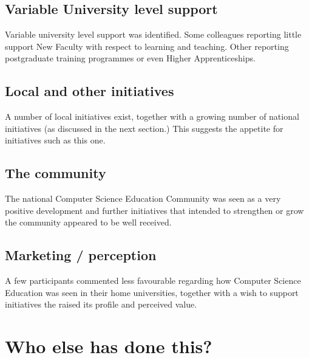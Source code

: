 \documentclass[sigconf]{acmart}
\begin{document}
\subsection{Variable University level support}
Variable university level support was identified. Some colleagues reporting little support New Faculty with respect to learning and teaching. Other reporting postgraduate training programmes or even Higher Apprenticeships.
\subsection{Local and other initiatives}
A number of local initiatives exist, together with a growing number of national initiatives (as discussed in the next section.) This suggests the appetite for initiatives such as this one.
\subsection{The community}
The national Computer Science Education Community was seen as a very positive development and further initiatives that intended to strengthen or grow the community appeared to be well received.
\subsection{Marketing / perception}
A few participants commented less favourable regarding how Computer Science Education was seen in their home universities, together with a wish to support initiatives the raised its profile and perceived value. 

\section{Who else has done this?}
\end{document}
